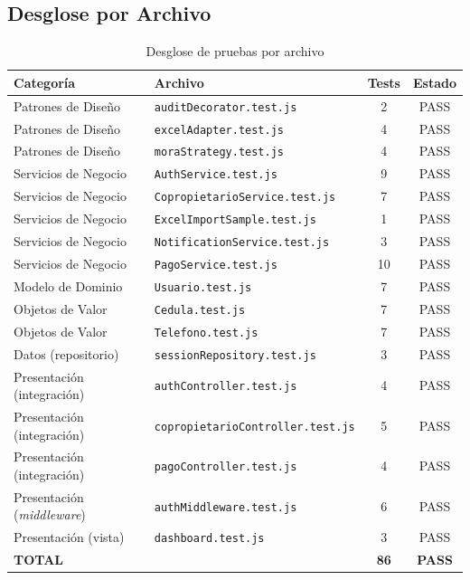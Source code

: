 \documentclass[12pt,a4paper]{article}
\begin{document}
\subsection{Desglose por Archivo}

\begin{table}[H]
\centering
\caption{Desglose de pruebas por archivo}
\label{tab:desglose-archivo}
\begin{tabular}{llcc}
\toprule
\textbf{Categoría} & \textbf{Archivo} & \textbf{Tests} & \textbf{Estado} \\
\midrule
Patrones de Diseño & \texttt{auditDecorator.test.js} & 2 & PASS \\
Patrones de Diseño & \texttt{excelAdapter.test.js} & 4 & PASS \\
Patrones de Diseño & \texttt{moraStrategy.test.js} & 4 & PASS \\
Servicios de Negocio & \texttt{AuthService.test.js} & 9 & PASS \\
Servicios de Negocio & \texttt{CopropietarioService.test.js} & 7 & PASS \\
Servicios de Negocio & \texttt{ExcelImportSample.test.js} & 1 & PASS \\
Servicios de Negocio & \texttt{NotificationService.test.js} & 3 & PASS \\
Servicios de Negocio & \texttt{PagoService.test.js} & 10 & PASS \\
Modelo de Dominio & \texttt{Usuario.test.js} & 7 & PASS \\
Objetos de Valor & \texttt{Cedula.test.js} & 7 & PASS \\
Objetos de Valor & \texttt{Telefono.test.js} & 7 & PASS \\
Datos (repositorio) & \texttt{sessionRepository.test.js} & 3 & PASS \\
Presentación (integración) & \texttt{authController.test.js} & 4 & PASS \\
Presentación (integración) & \texttt{copropietarioController.test.js} & 5 & PASS \\
Presentación (integración) & \texttt{pagoController.test.js} & 4 & PASS \\
Presentación (\emph{middleware}) & \texttt{authMiddleware.test.js} & 6 & PASS \\
Presentación (vista) & \texttt{dashboard.test.js} & 3 & PASS \\
\midrule
\textbf{TOTAL} & & \textbf{86} & \textbf{PASS} \\
\bottomrule
\end{tabular}
\end{table}
\end{document}
